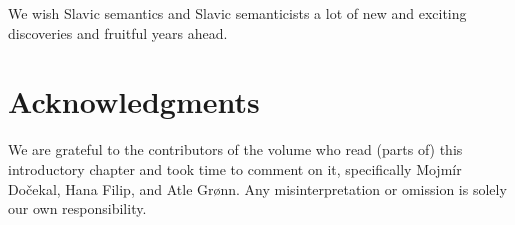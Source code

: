 \documentclass[output=paper,colorlinks,citecolor=brown]{langscibook}
\begin{document}
We wish Slavic semantics and Slavic semanticists a lot of new and exciting discoveries and fruitful years ahead.

\section*{Acknowledgments}
We are grateful to the contributors of the volume who read (parts of) this introductory chapter and took time to comment on it, specifically Mojmír Dočekal, Hana Filip, and Atle Grønn. Any misinterpretation or omission is solely our own responsibility.

\sloppy
\printbibliography[heading=subbibliography,notkeyword=this]
\end{document}
